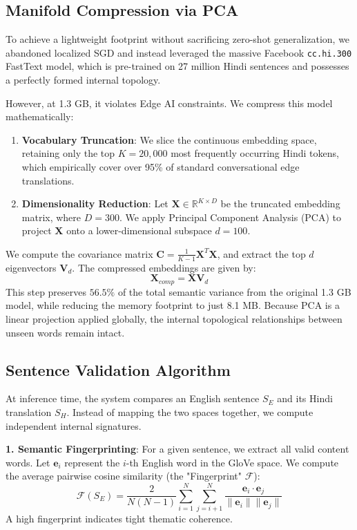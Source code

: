 \documentclass[conference]{IEEEtran}
\begin{document}
\subsection{Manifold Compression via PCA}
To achieve a lightweight footprint without sacrificing zero-shot generalization, we abandoned localized SGD and instead leveraged the massive Facebook \texttt{cc.hi.300} FastText model, which is pre-trained on 27 million Hindi sentences and possesses a perfectly formed internal topology. 

However, at 1.3 GB, it violates Edge AI constraints. We compress this model mathematically:
\begin{enumerate}
    \item \textbf{Vocabulary Truncation}: We slice the continuous embedding space, retaining only the top $K=20,000$ most frequently occurring Hindi tokens, which empirically cover over 95\% of standard conversational edge translations.
    \item \textbf{Dimensionality Reduction}: Let $\mathbf{X} \in \mathbb{R}^{K \times D}$ be the truncated embedding matrix, where $D=300$. We apply Principal Component Analysis (PCA) to project $\mathbf{X}$ onto a lower-dimensional subspace $d=100$. 
\end{enumerate}

We compute the covariance matrix $\mathbf{C} = \frac{1}{K-1} \mathbf{X}^T \mathbf{X}$, and extract the top $d$ eigenvectors $\mathbf{V}_d$. The compressed embeddings are given by:
\begin{equation}
    \mathbf{X}_{comp} = \mathbf{X} \mathbf{V}_d
\end{equation}
This step preserves $56.5\%$ of the total semantic variance from the original 1.3 GB model, while reducing the memory footprint to just 8.1 MB. Because PCA is a linear projection applied globally, the internal topological relationships between unseen words remain intact.

\subsection{Sentence Validation Algorithm}
At inference time, the system compares an English sentence $S_E$ and its Hindi translation $S_H$. Instead of mapping the two spaces together, we compute independent internal signatures.

\textbf{1. Semantic Fingerprinting}: For a given sentence, we extract all valid content words. Let $\mathbf{e}_i$ represent the $i$-th English word in the GloVe space. We compute the average pairwise cosine similarity (the "Fingerprint" $\mathcal{F}$):
\begin{equation}
    \mathcal{F}(S_E) = \frac{2}{N(N-1)} \sum_{i=1}^{N} \sum_{j=i+1}^{N} \frac{\mathbf{e}_i \cdot \mathbf{e}_j}{\|\mathbf{e}_i\| \|\mathbf{e}_j\|}
\end{equation}
A high fingerprint indicates tight thematic coherence. 
\end{document}
